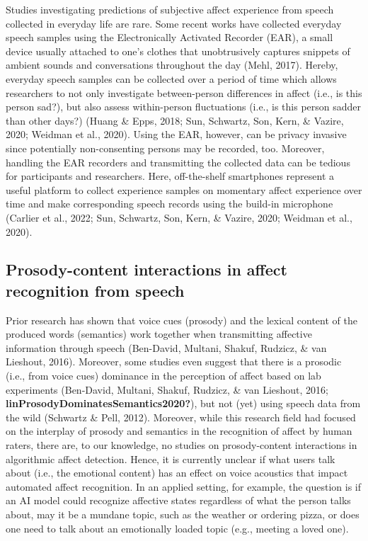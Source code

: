 \documentclass[
  english,
  man,floatsintext]{apa6}
\begin{document}
Studies investigating predictions of subjective affect experience from speech collected in everyday life are rare. Some recent works have collected everyday speech samples using the Electronically Activated Recorder (EAR), a small device usually attached to one's clothes that unobtrusively captures snippets of ambient sounds and conversations throughout the day (Mehl, 2017). Hereby, everyday speech samples can be collected over a period of time which allows researchers to not only investigate between-person differences in affect (i.e., is this person sad?), but also assess within-person fluctuations (i.e., is this person sadder than other days?) (Huang \& Epps, 2018; Sun, Schwartz, Son, Kern, \& Vazire, 2020; Weidman et al., 2020). Using the EAR, however, can be privacy invasive since potentially non-consenting persons may be recorded, too. Moreover, handling the EAR recorders and transmitting the collected data can be tedious for participants and researchers. Here, off-the-shelf smartphones represent a useful platform to collect experience samples on momentary affect experience over time and make corresponding speech records using the build-in microphone (Carlier et al., 2022; Sun, Schwartz, Son, Kern, \& Vazire, 2020; Weidman et al., 2020).

\hypertarget{prosody-content-interactions-in-affect-recognition-from-speech}{%
\subsection{Prosody-content interactions in affect recognition from speech}\label{prosody-content-interactions-in-affect-recognition-from-speech}}

Prior research has shown that voice cues (prosody) and the lexical content of the produced words (semantics) work together when transmitting affective information through speech (Ben-David, Multani, Shakuf, Rudzicz, \& van Lieshout, 2016). Moreover, some studies even suggest that there is a prosodic (i.e., from voice cues) dominance in the perception of affect based on lab experiments (Ben-David, Multani, Shakuf, Rudzicz, \& van Lieshout, 2016; \textbf{linProsodyDominatesSemantics2020?}), but not (yet) using speech data from the wild (Schwartz \& Pell, 2012). Moreover, while this research field had focused on the interplay of prosody and semantics in the recognition of affect by human raters, there are, to our knowledge, no studies on prosody-content interactions in algorithmic affect detection. Hence, it is currently unclear if what users talk about (i.e., the emotional content) has an effect on voice acoustics that impact automated affect recognition. In an applied setting, for example, the question is if an AI model could recognize affective states regardless of what the person talks about, may it be a mundane topic, such as the weather or ordering pizza, or does one need to talk about an emotionally loaded topic (e.g., meeting a loved one).
\end{document}
